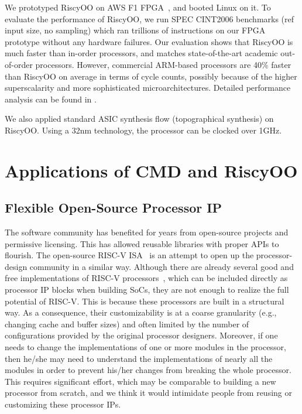 \documentclass[conference]{IEEEtran}
\begin{document}
We prototyped RiscyOO on AWS F1 FPGA~\cite{awsf1}, and booted Linux on it.
To evaluate the performance of RiscyOO, we run SPEC CINT2006 benchmarks (ref input size, no sampling) which ran trillions of instructions on our FPGA prototype without any hardware failures.
Our evaluation shows that RiscyOO is much faster than in-order processors, and matches state-of-the-art academic out-of-order processors.
However, commercial ARM-based processors are 40\% faster than RiscyOO on average in terms of cycle counts, possibly because of the higher superscalarity and more sophisticated microarchitectures.
Detailed performance analysis can be found in \cite{riscyoo}.

We also applied standard ASIC synthesis flow (topographical synthesis) on RiscyOO.
Using a 32nm technology, the processor can be clocked over 1GHz.


\section{Applications of CMD and RiscyOO}\label{sec:app}

\subsection{Flexible Open-Source Processor IP}
The software community has benefited for years from open-source projects and permissive licensing. 
This has allowed reusable libraries with proper APIs to flourish. 
The open-source RISC-V ISA~\cite{riscv} is an attempt to open up the processor-design community in a similar way.
Although there are already several good and free implementations of RISC-V processors~\cite{rocketchip,boom,pulp}, which can be included directly as processor IP blocks when building SoCs, they are not enough to realize the full potential of RISC-V.
This is because these processors are built in a structural way.
As a consequence, their customizability is at a coarse granularity (e.g., changing cache and buffer sizes) and often limited by the number of configurations provided by the original processor designers.
Moreover, if one needs to change the implementations of one or more modules in the processor, then he/she may need to understand the implementations of nearly all the modules in order to prevent his/her changes from breaking the whole processor.
This requires significant effort, which may be comparable to building a new processor from scratch, and we think it would intimidate people from reusing or customizing these processor IPs.
\end{document}
